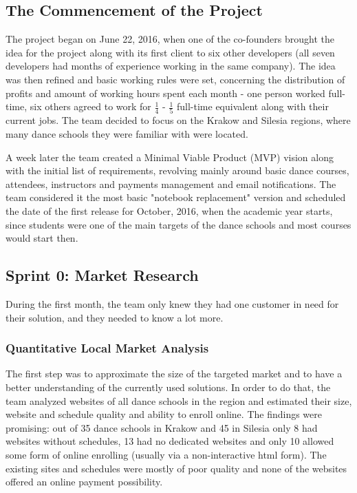 \documentclass{article}
\begin{document}
\subsection{The Commencement of the Project}
The project began on June 22, 2016, when one of the co-founders brought the idea for the project along with its first client to six other developers (all seven developers had months of experience working in the same company). The idea was then refined and basic working rules were set, concerning the distribution of profits and amount of working hours spent each month - one person worked full-time, six others agreed to work for \( \frac{1}{4} \) - \( \frac{1}{5} \) full-time equivalent along with their current jobs. The team decided to focus on the Krakow and Silesia regions, where many dance schools they were familiar with were located.

A week later the team created a Minimal Viable Product (MVP) vision along with the initial list of requirements, revolving mainly around basic dance courses, attendees, instructors and payments management and email notifications. The team considered it the most basic "notebook replacement" version and scheduled the date of the first release for October, 2016, when the academic year starts, since students were one of the main targets of the dance schools and most courses would start then.

\subsection{Sprint 0: Market Research}
During the first month, the team only knew they had one customer in need for their solution, and they needed to know a lot more.

\subsubsection{Quantitative Local Market Analysis}
The first step was to approximate the size of the targeted market and to have a better understanding of the currently used solutions. In order to do that, the team analyzed websites of all dance schools in the region and estimated their size, website and schedule quality and ability to enroll online. The findings were promising: out of 35 dance schools in Krakow and 45 in Silesia only 8 had websites without schedules, 13 had no dedicated websites and only 10 allowed some form of online enrolling (usually via a non-interactive html form). The existing sites and schedules were mostly of poor quality and none of the websites offered an online payment possibility.
\end{document}
